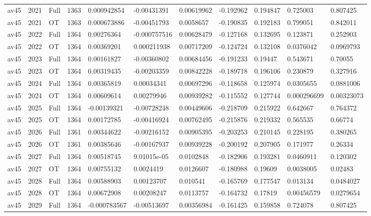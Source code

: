 \begin{landscape}
\begin{longtable}{lllllllllll}
av45 & 2021 & Full & 1363 & 0.000942854 & -0.00431391 & 0.00619962 & -0.192962 & 0.194847 & 0.725003 & 0.807425 \\
av45 & 2021 & OT & 1363 & 0.000673886 & -0.00451793 & 0.0058657 & -0.190835 & 0.192183 & 0.799051 & 0.842011 \\
av45 & 2022 & Full & 1364 & 0.00276364 & -0.000757516 & 0.00628479 & -0.127168 & 0.132695 & 0.123871 & 0.252903 \\
av45 & 2022 & OT & 1364 & 0.00369201 & 0.000211938 & 0.00717209 & -0.124724 & 0.132108 & 0.0376042 & 0.0969793 \\
av45 & 2023 & Full & 1364 & 0.00161827 & -0.00360802 & 0.00684456 & -0.191233 & 0.19447 & 0.543671 & 0.70055 \\
av45 & 2023 & OT & 1364 & 0.00319435 & -0.00203359 & 0.00842228 & -0.189718 & 0.196106 & 0.230879 & 0.327916 \\
av45 & 2024 & Full & 1364 & 0.00365819 & 0.00034341 & 0.00697296 & -0.118658 & 0.125974 & 0.0305655 & 0.0881006 \\
av45 & 2024 & OT & 1364 & 0.00609614 & 0.00279946 & 0.00939282 & -0.115552 & 0.127744 & 0.000296699 & 0.00323073 \\
av45 & 2025 & Full & 1364 & -0.00139321 & -0.00728248 & 0.00449606 & -0.218709 & 0.215922 & 0.642667 & 0.764372 \\
av45 & 2025 & OT & 1364 & 0.00172785 & -0.00416924 & 0.00762495 & -0.215876 & 0.219332 & 0.565535 & 0.66774 \\
av45 & 2026 & Full & 1361 & 0.00344622 & -0.00216152 & 0.00905395 & -0.203253 & 0.210145 & 0.228195 & 0.380265 \\
av45 & 2026 & OT & 1361 & 0.00385646 & -0.00167937 & 0.00939228 & -0.200192 & 0.207905 & 0.171977 & 0.26334 \\
av45 & 2027 & Full & 1364 & 0.00518745 & 9.01015e-05 & 0.0102848 & -0.182906 & 0.193281 & 0.0460911 & 0.120302 \\
av45 & 2027 & OT & 1364 & 0.00755132 & 0.0024419 & 0.0126607 & -0.180988 & 0.19609 & 0.0038005 & 0.02483 \\
av45 & 2028 & Full & 1364 & 0.00588903 & 0.00123707 & 0.010541 & -0.165769 & 0.177547 & 0.013134 & 0.0484027 \\
av45 & 2028 & OT & 1364 & 0.00672908 & 0.00208247 & 0.0113757 & -0.164732 & 0.17819 & 0.00456579 & 0.0279654 \\
av45 & 2029 & Full & 1364 & -0.000783567 & -0.00513697 & 0.00356984 & -0.161425 & 0.159858 & 0.724078 & 0.807425 \\

\end{longtable}
\end{landscape}
